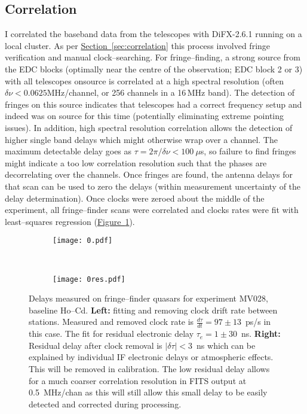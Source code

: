 	\subsection{Correlation}
		I correlated the baseband data from the telescopes with DiFX-2.6.1 \citep{Deller2011} running on a local cluster. As per \hyperref[sec:correlation]{Section~\ref*{sec:correlation}} this process involved fringe verification and manual clock--searching. For fringe--finding, a strong source from the EDC blocks (optimally near the centre of the observation; EDC block 2 or 3) with all telescopes onsource is correlated at a high spectral resolution (often $\delta\nu<0.0625$MHz/channel, or 256 channels in a 16\,MHz band). The detection of fringes on this source indicates that telescopes had a correct frequency setup and indeed was on source for this time (potentially eliminating extreme pointing issues). In addition, high spectral resolution correlation allows the detection of higher single band delays which might otherwise wrap over a channel. The maximum detectable delay goes as $\tau=2\pi/\delta\nu<100~\mu$s, so failure to find fringes might indicate a too low correlation resolution such that the phases are decorrelating over the channels. Once fringes are found, the antenna delays for that scan can be used to zero the delays (within measurement uncertainty of the delay determination). Once clocks were zeroed about the middle of the experiment, all fringe--finder scans were correlated and clocks rates were fit with least--squares regression (\hyperref[fig:correlation]{Figure~\ref*{fig:correlation}}).
	    \begin{figure}[h]
	    	\centering
	    	\begin{subfigure}[t]{0.45\textwidth}
	    		\texttt{[image: 0.pdf]}
	    	\end{subfigure}
	    	~
	    	\begin{subfigure}[t]{0.45\textwidth}
	    		\texttt{[image: 0res.pdf]}
	    	\end{subfigure}
	    	\caption[Bayesian clock--fitting]{Delays measured on fringe--finder quasars for experiment MV028, baseline Ho--Cd. \textbf{Left:} fitting and removing clock drift rate between stations. Measured and removed clock rate is $\frac{d\tau}{dt}=97\pm13$~ps/s in this case. The fit for residual electronic delay $\tau_e=1\pm30$~ns. \textbf{Right:} Residual delay after clock removal is $|\delta\tau|<3$~ns which can be explained by individual IF electronic delays or atmospheric effects. This will be removed in \aips\space calibration. The low residual delay allows for a much coarser correlation resolution in FITS output at 0.5~MHz/chan as this will still allow this small delay to be easily detected and corrected during processing.} \label{fig:correlation}
	    \end{figure}	    
